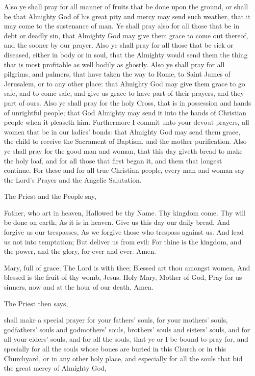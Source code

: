 Also ye shall pray for all manner of fruits that be done upon the ground, or shall be that Almighty God of his great pity and mercy may send such weather, that it may come to the sustenance of man. Ye shall pray also for all those that be in debt or deadly sin, that Almighty God may give them grace to come out thereof, and the sooner by our prayer. Also ye shall pray for all those that be sick or diseased, either in body or in soul, that the Almighty would send them the thing that is most profitable as well bodily as ghostly. Also ye shall pray for all pilgrims, and palmers, that have taken the way to Rome, to Saint James of Jerusalem, or to any other place: that Almighty God may give them grace to go safe, and to come safe, and give us grace to have part of their prayers, and they part of ours. Also ye shall pray for the holy Cross, that is in possession and hands of unrightful people; that God Almighty may send it into the hands of Christian people when it pleaseth him. Furthermore I commit unto your devout prayers, all women that be in our ladies' bonds: that Almighty God may send them grace, the child to receive the Sacrament of Baptism, and the mother purification. Also ye shall pray for the good man and woman, that this day giveth bread to make the holy loaf, and for all those that first began it, and them that longest continue. For these and for all true Christian people, every man and woman say the Lord's Prayer and the Angelic Salutation.
\begin{rubric}
    The Priest and the People say,
\end{rubric}
 Father, who art in heaven, Hallowed be thy Name. Thy kingdom come. Thy will be done on earth, As it is in heaven. Give us this day our daily bread. And forgive us our trespasses, As we forgive those who trespass against us. And lead us not into temptation; But deliver us from evil: For thine is the kingdom, and the power, and the glory, for ever and ever. Amen.
\par\noindent
{}
 Mary, full of grace; The Lord is with thee; Blessed art thou amongst women, And blessed is the fruit of thy womb, Jesus. Holy Mary, Mother of God, Pray for us sinners, now and at the hour of our death. Amen.
\begin{rubric}
    The Priest then says,
\end{rubric}
 shall make a special prayer for your fathers' souls, for your mothers' souls, godfathers' souls and godmothers' souls, brothers' souls and sisters' souls, and for all your elders' souls, and for all the souls, that ye or I be bound to pray for, and specially for all the souls whose bones are buried in this Church or in this Churchyard, or in any other holy place, and especially for all the souls that bid the great mercy of Almighty God, %
